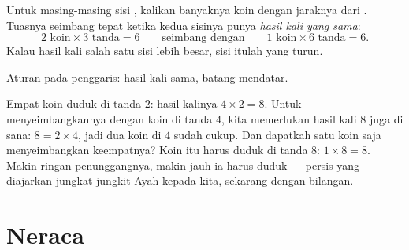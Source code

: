 \begin{proposition}\label{prop:g3:levers-and-scales:rule}
Untuk masing-masing sisi , kalikan banyaknya koin dengan jaraknya
dari . Tuasnya seimbang tepat ketika kedua sisinya punya
\emph{hasil kali yang sama}:
\[
2 \text{ koin} \times 3 \text{ tanda} = 6
\qquad\text{seimbang dengan}\qquad
1 \text{ koin} \times 6 \text{ tanda} = 6 .
\]
Kalau hasil kali salah satu sisi lebih besar, sisi itulah yang turun.
\end{proposition}

\begin{omfigure}

{\small Aturan  pada penggaris: hasil kali sama, batang mendatar.}
\end{omfigure}

\begin{example}\label{ex:g3:levers-and-scales:using}
Empat koin duduk di tanda $2$: hasil kalinya $4 \times 2 = 8$. Untuk
menyeimbangkannya dengan koin di tanda $4$, kita memerlukan hasil kali
$8$ juga di sana: $8 = 2 \times 4$, jadi dua koin di $4$ sudah cukup.
Dan dapatkah satu koin saja menyeimbangkan keempatnya? Koin itu
harus duduk di tanda $8$: $1 \times 8
= 8$. Makin ringan penunggangnya, makin jauh ia harus duduk ---
persis yang diajarkan jungkat-jungkit Ayah kepada kita, sekarang
dengan bilangan.
\end{example}

\section{Neraca}

